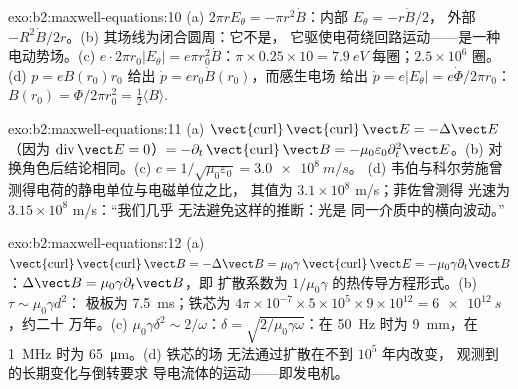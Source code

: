 \begin{solution}{exo:b2:maxwell-equations:10}
(a) $2\pi rE_\theta = -\pi r^2\dot B$：内部 $E_\theta = -r\dot B/2$，
外部 $-R^2\dot B/2r$。(b) 其场线为闭合圆周：它不是，
它驱使电荷绕回路运动——是一种电动势场。(c) $e\cdot2\pi r_0
|E_\theta| = e\pi r_0^2\dot B$：$\pi \times 0.25 \times 10 = \qty{7.9}{eV}$ 每圈；$2.5 \times 10^6$
圈。(d) $p = eB(r_0)r_0$ 给出 $\dot p = er_0\dot B(r_0)$，而感生电场
给出 $\dot p = e|E_\theta| = e\dot\Phi/2\pi r_0$：$B(r_0) = \Phi/2\pi r_0^2 =
\tfrac12\langle B\rangle$.
\end{solution}

\begin{solution}{exo:b2:maxwell-equations:11}
(a) $\operatorname{\vect{curl}}\operatorname{\vect{curl}}\vect E = -\Delta\vect E$（因为 $\operatorname{div}
\vect E = 0$）$= -\partial_t\operatorname{\vect{curl}}\vect B = -\mu_0\varepsilon_0\partial_t^2\vect E$。(b)
对换角色后结论相同。(c) $c = 1/\sqrt{\mu_0\varepsilon_0} = \qty{3.0e8}{m/s}$。
(d) 韦伯与科尔劳施曾测得电荷的静电单位与电磁单位之比，
其值为 $3.1 \times 10^8$ m/s；菲佐曾测得
光速为 $3.15 \times 10^8$ m/s：“我们几乎
无法避免这样的推断：光是
同一介质中的横向波动。”
\end{solution}

\begin{solution}{exo:b2:maxwell-equations:12}
(a) $\operatorname{\vect{curl}}\operatorname{\vect{curl}}\vect B = -\Delta\vect B = \mu_0\gamma\operatorname{\vect{curl}}
\vect E = -\mu_0\gamma\partial_t\vect B$：$\Delta\vect B = \mu_0\gamma\partial_t\vect B$，即
扩散系数为 $1/\mu_0\gamma$ 的热传导方程形式。(b) $\tau \sim \mu_0\gamma d^2$：
极板为 \qty{7.5}{ms}；铁芯为 $4\pi \times 10^{-7} \times 5 \times 10^5 \times 9 \times 10^{12} = \qty{6e12}{s}$，约二十
万年。(c) $\mu_0\gamma\delta^2 \sim 2/\omega$：$\delta = \sqrt{2/\mu_0
\gamma\omega}$：在 \qty{50}{Hz} 时为 \qty{9}{mm}，在 \qty{1}{MHz} 时为 \qty{65}{\micro m}。(d) 铁芯的场
无法通过扩散在不到 $10^5$ 年内改变，
观测到的长期变化与倒转要求
导电流体的运动——即发电机。
\end{solution}

